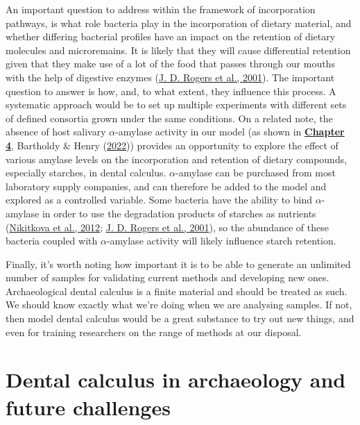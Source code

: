 \documentclass[
  letterpaper,
]{book}
\begin{document}
An important question to address within the framework of incorporation
pathways, is what role bacteria play in the incorporation of dietary
material, and whether differing bacterial profiles have an impact on the
retention of dietary molecules and microremains. It is likely that they
will cause differential retention given that they make use of a lot of
the food that passes through our mouths with the help of digestive
enzymes (\protect\hyperlink{ref-rogersRoleStreptococcus2001}{J. D.
Rogers et al., 2001}). The important question to answer is how, and, to
what extent, they influence this process. A systematic approach would be
to set up multiple experiments with different sets of defined consortia
grown under the same conditions. On a related note, the absence of host
salivary \(\alpha\)-amylase activity in our model (as shown in
\protect\hyperlink{byoc-starch}{\textbf{Chapter 4}}, Bartholdy \& Henry
(\protect\hyperlink{ref-bartholdyInvestigatingBiases2022}{2022}))
provides an opportunity to explore the effect of various amylase levels
on the incorporation and retention of dietary compounds, especially
starches, in dental calculus. \(\alpha\)-amylase can be purchased from
most laboratory supply companies, and can therefore be added to the
model and explored as a controlled variable. Some bacteria have the
ability to bind \(\alpha\)-amylase in order to use the degradation
products of starches as nutrients
(\protect\hyperlink{ref-nikitkovaEffectStarch2012}{Nikitkova et al.,
2012}; \protect\hyperlink{ref-rogersRoleStreptococcus2001}{J. D. Rogers
et al., 2001}), so the abundance of these bacteria coupled with
\(\alpha\)-amylase activity will likely influence starch retention.

Finally, it's worth noting how important it is to be able to generate an
unlimited number of samples for validating current methods and
developing new ones. Archaeological dental calculus is a finite material
and should be treated as such. We should know exactly what we're doing
when we are analysing samples. If not, then model dental calculus would
be a great substance to try out new things, and even for training
researchers on the range of methods at our disposal.

\hypertarget{dental-calculus-in-archaeology-and-future-challenges}{%
\section{Dental calculus in archaeology and future
challenges}\label{dental-calculus-in-archaeology-and-future-challenges}}
\end{document}
